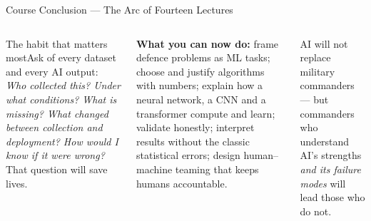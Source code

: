 \documentclass[aspectratio=169,10pt,t]{beamer}
\begin{document}
\begin{frame}{Course Conclusion --- The Arc of Fourteen Lectures}
\begin{columns}[T]
\vspace{8pt}\begin{cbox}[ISSAnavy]{The habit that matters most}\scriptsize Ask of every dataset and every AI output: \emph{Who collected this? Under what conditions? What is missing? What changed between collection and deployment? How would I know if it were wrong?} That question will save lives.\end{cbox}
\begin{rbox}\scriptsize\textbf{What you can now do:} frame defence problems as ML tasks; choose and justify algorithms with numbers; explain how a neural network, a CNN and a transformer compute and learn; validate honestly; interpret results without the classic statistical errors; design human--machine teaming that keeps humans accountable.\end{rbox}
\begin{wbox}\scriptsize AI will not replace military commanders --- but commanders who understand AI's strengths \emph{and its failure modes} will lead those who do not.\end{wbox}
\end{columns}
\end{frame}
\end{document}
